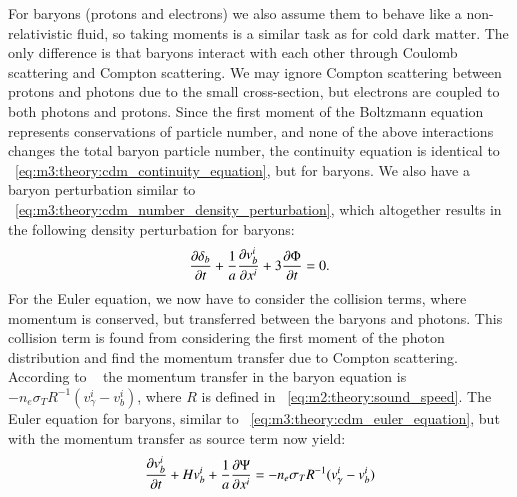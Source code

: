     For baryons (protons and electrons) we also assume them to behave like a non-relativistic fluid, so taking moments is a similar task as for cold dark matter. The only difference is that baryons interact with each other through Coulomb scattering and Compton scattering. We may ignore Compton scattering between protons and photons due to the small cross-section, but electrons are coupled to both photons and protons. Since the first moment of the Boltzmann equation represents conservations of particle number, and none of the above interactions changes the total baryon particle number, the continuity equation is identical to ~\cref{eq:m3:theory:cdm_continuity_equation}, but for baryons. We also have a baryon perturbation similar to ~\cref{eq:m3:theory:cdm_number_density_perturbation}, which altogether results in the following density perturbation for baryons:
    \begin{equation}\label{eq:m3:theory:baryon_density_perturbation}
        \pdv{\delta_b}{t}+\frac{1}{a}\pdv{v_b^i}{x^i} + 3\pdv{\Phi}{t} = 0.
    \end{equation}
    For the Euler equation, we now have to consider the collision terms, where momentum is conserved, but transferred between the baryons and photons. This collision term is found from considering the first moment of the photon distribution and find the momentum transfer due to Compton scattering. According to ~\cite{AST5220LectureNotes} the momentum transfer in the baryon equation is $-n_e\sigma_TR^{-1}(v_\gamma^i-v_b^i)$, where $R$ is defined in ~\cref{eq:m2:theory:sound_speed}. The Euler equation for baryons, similar to ~\cref{eq:m3:theory:cdm_euler_equation}, but with the momentum transfer as source term now yield:
    \begin{equation}\label{eq:m3:theory:baryon_euler_equation}
        \pdv{v_b^i}{t}+Hv_b^i + \frac{1}{a}\pdv{\Psi}{x^i} = -n_e\sigma_TR^{-1}(v_\gamma^i-v_b^i)
    \end{equation}

